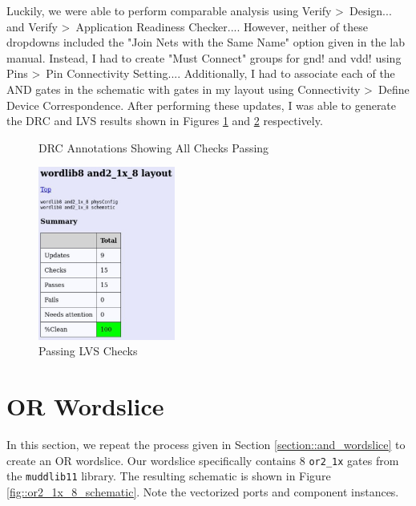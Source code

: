 \documentclass{article}
\begin{document}
	\noindent Luckily, we were able to perform comparable analysis using Verify \textgreater\ Design... and Verify \textgreater\ Application Readiness Checker.... However, neither of these dropdowns included the "Join Nets with the Same Name" option given in the lab manual. Instead, I had to create "Must Connect" groups for gnd! and vdd! using Pins \textgreater\ Pin Connectivity Setting.... Additionally, I had to associate each of the AND gates in the schematic with gates in my layout using Connectivity \textgreater\ Define Device Correspondence. After performing these updates, I was able to generate the DRC and LVS results shown in Figures \ref{fig::and_drc} and \ref{fig::and_lvs} respectively.
	
	\begin{figure}[H]
		\centerline{}
		\caption{DRC Annotations Showing All Checks Passing}
		\label{fig::and_drc}
	\end{figure}
	
	\begin{figure}[H]
		\centerline{\includegraphics[width=0.4\textwidth]{and_lvs.png}}
		\caption{Passing LVS Checks}
		\label{fig::and_lvs}
	\end{figure}
	
	\section{OR Wordslice}
	
	In this section, we repeat the process given in Section \ref{section::and_wordslice} to create an OR wordslice.  Our wordslice specifically contains 8 \texttt{or2\_1x} gates from the \texttt{muddlib11} library. The resulting schematic is shown in Figure \ref{fig::or2_1x_8_schematic}. Note the vectorized ports and component instances.
	
\end{document}
